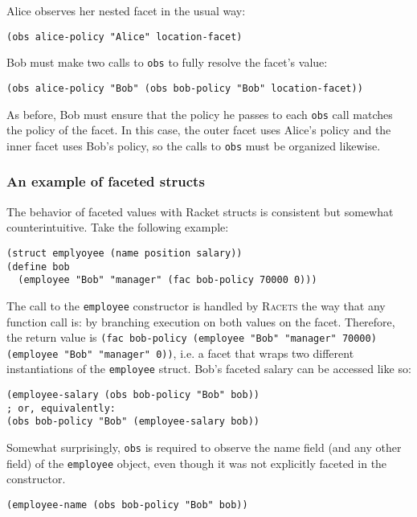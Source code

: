 \documentclass{article}
\begin{document}
Alice observes her nested facet in the usual way:

\begin{lstlisting}
(obs alice-policy "Alice" location-facet)
\end{lstlisting}

Bob must make two calls to \texttt{obs} to fully resolve the facet's value:

\begin{lstlisting}
(obs alice-policy "Bob" (obs bob-policy "Bob" location-facet))
\end{lstlisting}

As before, Bob must ensure that the policy he passes to each \texttt{obs} call matches the policy of the facet. In this case, the outer facet uses Alice's policy and the inner facet uses Bob's policy, so the calls to \texttt{obs} must be organized likewise.

\subsubsection{An example of faceted structs}
The behavior of faceted values with Racket structs is consistent but somewhat counterintuitive. Take the following example:

\begin{lstlisting}
(struct emplyoyee (name position salary))
(define bob
  (employee "Bob" "manager" (fac bob-policy 70000 0)))
\end{lstlisting}

The call to the \texttt{employee} constructor is handled by \textsc{Racets} the way that any function call is: by branching execution on both values on the facet. Therefore, the return value is \texttt{(fac bob-policy (employee "Bob" "manager" 70000) (employee "Bob" "manager" 0))}, i.e. a facet that wraps two different instantiations of the \texttt{employee} struct. Bob's faceted salary can be accessed like so:

\begin{lstlisting}
(employee-salary (obs bob-policy "Bob" bob))
; or, equivalently:
(obs bob-policy "Bob" (employee-salary bob))
\end{lstlisting}

Somewhat surprisingly, \texttt{obs} is required to observe the name field (and any other field) of the \texttt{employee} object, even though it was not explicitly faceted in the constructor.

\begin{lstlisting}
(employee-name (obs bob-policy "Bob" bob))
\end{lstlisting}
\end{document}
